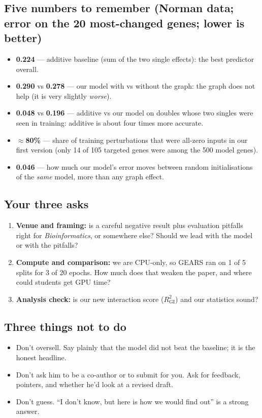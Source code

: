 \documentclass[10.5pt]{article}
\begin{document}
\subsection*{Five numbers to remember (Norman data; error on the 20 most-changed genes; lower is better)}
\begin{itemize}
\item \textbf{0.224} --- additive baseline (sum of the two single effects): the best predictor overall.
\item \textbf{0.290} vs \textbf{0.278} --- our model with vs without the graph: the graph does not help
(it is very slightly \emph{worse}).
\item \textbf{0.048} vs \textbf{0.196} --- additive vs our model on doubles whose two singles were seen in
training: additive is about four times more accurate.
\item \textbf{$\approx$80\%} --- share of training perturbations that were all-zero inputs in our first
version (only 14 of 105 targeted genes were among the 500 model genes).
\item \textbf{0.046} --- how much our model's error moves between random initialisations of the \emph{same}
model, more than any graph effect.
\end{itemize}

\subsection*{Your three asks}
\begin{enumerate}
\item \textbf{Venue and framing:} is a careful negative result plus evaluation pitfalls right for
\emph{Bioinformatics}, or somewhere else? Should we lead with the model or with the pitfalls?
\item \textbf{Compute and comparison:} we are CPU-only, so GEARS ran on 1 of 5 splits for 3 of 20 epochs.
How much does that weaken the paper, and where could students get GPU time?
\item \textbf{Analysis check:} is our new interaction score ($R^2_{\mathrm{GI}}$) and our statistics sound?
\end{enumerate}

\subsection*{Three things not to do}
\begin{itemize}
\item Don't oversell. Say plainly that the model did not beat the baseline; it is the honest headline.
\item Don't ask him to be a co-author or to submit for you. Ask for feedback, pointers, and whether he'd
look at a revised draft.
\item Don't guess. ``I don't know, but here is how we would find out'' is a strong answer.
\end{itemize}
\end{document}
